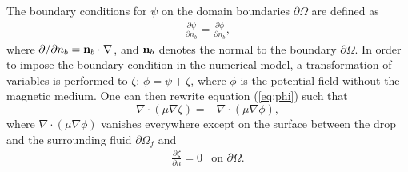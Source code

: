 The boundary conditions for $\psi$ 
on the domain boundaries $\partial \Omega$ are defined as
\begin{eqnarray}
\frac{\partial \psi}{\partial n_b} = \frac{\partial \phi}{\partial n_b}, %
\end{eqnarray}
where $\partial /\partial n_b={\bf n}_b\cdot\nabla$, and ${\bf n}_b$  denotes the normal to the 
boundary $\partial \Omega$.
In order to impose the boundary condition in the numerical model,
a transformation of variables is performed to $\zeta$: $\phi=\psi+\zeta$, where
$\phi$ is the potential field without the magnetic medium.
One can then rewrite equation (\ref{eq:phi}) such that
\begin{equation}
\nabla\cdot(\mu\nabla\zeta)=-\nabla\cdot(\mu\nabla\phi),\label{magnet2}
\end{equation}
where $\nabla\cdot(\mu\nabla\phi)$ vanishes everywhere except on the surface
between the drop and the surrounding fluid $\partial \Omega_f$ and 
\begin{eqnarray}
\frac{\partial \zeta}{\partial n} = 0 & \mbox{on $\partial \Omega$}.\label{BCmagnet2}
\end{eqnarray}


